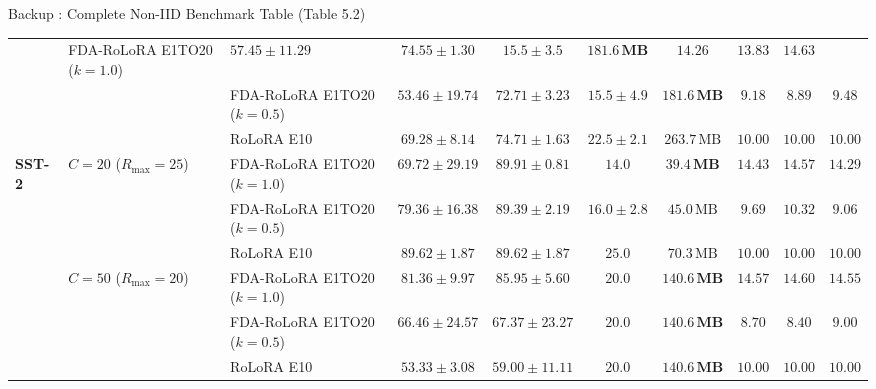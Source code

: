 \documentclass[aspectratio=169]{beamer}
\begin{document}
\begin{frame}[noframenumbering, label=backup_noniid_table]{Backup : Complete Non-IID Benchmark Table (Table 5.2)}
{\begin{tabular}{lllccccccc}
        & FDA-RoLoRA E1TO20 ($k=1.0$) & $57.45 \pm 11.29$ & $74.55 \pm 1.30$ & $\mathbf{15.5 \pm 3.5}$ & $\mathbf{181.6\,\text{MB}}$ & $14.26$ & $13.83$ & $14.63$ \\
        & & FDA-RoLoRA E1TO20 ($k=0.5$) & $53.46 \pm 19.74$ & $72.71 \pm 3.23$ & $\mathbf{15.5 \pm 4.9}$ & $\mathbf{181.6\,\text{MB}}$ & $9.18$ & $8.89$ & $9.48$ \\
        & & RoLoRA E10 & $\mathbf{69.28 \pm 8.14}$ & $\mathbf{74.71 \pm 1.63}$ & $22.5 \pm 2.1$ & $263.7\,\text{MB}$ & $10.00$ & $10.00$ & $10.00$ \\
        \midrule
        \multirow{6}{*}{\textbf{SST-2}} 
        & \multirow{3}{*}{$C=20$ ($R_{\max}=25$)} 
        & FDA-RoLoRA E1TO20 ($k=1.0$) & $69.72 \pm 29.19$ & $\mathbf{89.91 \pm 0.81}$ & $\mathbf{14.0}$ & $\mathbf{39.4\,\text{MB}}$ & $14.43$ & $14.57$ & $14.29$ \\
        & & FDA-RoLoRA E1TO20 ($k=0.5$) & $79.36 \pm 16.38$ & $89.39 \pm 2.19$ & $16.0 \pm 2.8$ & $45.0\,\text{MB}$ & $9.69$ & $10.32$ & $9.06$ \\
        & & RoLoRA E10 & $\mathbf{89.62 \pm 1.87}$ & $89.62 \pm 1.87$ & $25.0$ & $70.3\,\text{MB}$ & $10.00$ & $10.00$ & $10.00$ \\
        \cmidrule{2-10}
        & \multirow{3}{*}{$C=50$ ($R_{\max}=20$)} 
        & FDA-RoLoRA E1TO20 ($k=1.0$) & $\mathbf{81.36 \pm 9.97}$ & $\mathbf{85.95 \pm 5.60}$ & $\mathbf{20.0}$ & $\mathbf{140.6\,\text{MB}}$ & $14.57$ & $14.60$ & $14.55$ \\
        & & FDA-RoLoRA E1TO20 ($k=0.5$) & $66.46 \pm 24.57$ & $67.37 \pm 23.27$ & $\mathbf{20.0}$ & $\mathbf{140.6\,\text{MB}}$ & $8.70$ & $8.40$ & $9.00$ \\
        & & RoLoRA E10 & $53.33 \pm 3.08$ & $59.00 \pm 11.11$ & $\mathbf{20.0}$ & $\mathbf{140.6\,\text{MB}}$ & $10.00$ & $10.00$ & $10.00$ \\
        \bottomrule
    \end{tabular}%
    }
\end{frame}
\end{document}
